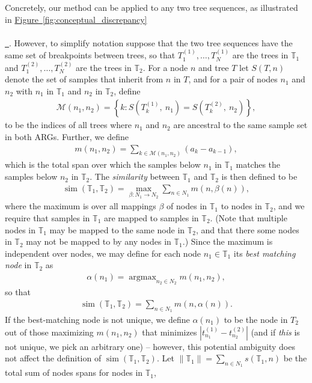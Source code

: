 \documentclass[10pt,twoside,lineno]{gsajnl}
\newcommand{\T}{\mathbb{T}}
\newcommand{\argmax}{\operatorname{argmax}}
\newcommand{\similarity}{\operatorname{sim}}
\newcommand*{\figref}[2][]{%
	\hyperref[{#2}]{%
		Figure~\ref*{#2}%
		\ifx\\#1\\%
		\else
		\,#1%
		\fi
	}%
}
\begin{document}
Concretely, our method can be applied to any two tree sequences,
as illustrated in \figref{fig:conceptual_discrepancy}.
However, to simplify notation suppose that the two tree sequences have the same set of breakpoints
between trees,
so that $T_1^{(1)}, \ldots, T_N^{(1)}$ are the trees in $\T_1$
and $T_1^{(2)}, \ldots, T_N^{(2)}$ are the trees in $\T_2$.
For a node $n$ and tree $T$
let $S(T, n)$ denote the set of samples that inherit from $n$ in $T$,
and for a pair of nodes $n_1$ and $n_2$ with $n_1$ in $\T_1$ and $n_2$ in $\T_2$,
define
\begin{align*}
	\mathcal{M}(n_1, n_2) = \left\{ k : S\left(T^{(1)}_k,\ n_1\right) = S\left(T^{(2)}_k,\ n_2\right) \right\},
\end{align*}
to be the indices of all trees where $n_1$ and $n_2$ are ancestral to the same sample set in both ARGs.
Further, we define
\begin{align*}
    m(n_1, n_2)
    =
    \sum_{k\in \mathcal{M}(n_1, n_2)} (a_k - a_{k-1}) ,  
\end{align*}
which is the total span over which the samples below $n_1$ in $\T_1$
matches the samples below $n_2$ in $\T_2$.
The \emph{similarity} between $\T_1$ and $\T_2$ is then defined to be
\begin{align*}
    \similarity(\T_1, \T_2)
    =
    \max_{\beta:N_1 \to N_2} \sum_{n \in N_1} m(n, \beta(n)) ,
\end{align*}
where the maximum is over all mappings $\beta$ of nodes in $\T_1$ to nodes in $\T_2$, and we require that samples in $\T_1$ are mapped to samples in $\T_2$.
(Note that multiple nodes in $\T_1$ may be mapped to the same node in $\T_2$,
and that there some nodes in $\T_2$ may not be mapped to by any nodes in $\T_1$.)
Since the maximum is independent over nodes, we may define for each node $n_1 \in \T_1$
its \emph{best matching node} in $\T_2$ as
\begin{align*}
    \alpha(n_1) = \argmax_{n_2 \in N_2} m(n_1, n_2) ,
\end{align*}
so that
\begin{align*}
    \similarity(\T_1, \T_2)
    =
    \sum_{n \in N_1} m(n, \alpha(n)) .
\end{align*}
If the best-matching node is not unique, we define $\alpha(n_1)$ to be the node in $T_2$
out of those maximizing $m(n_1, n_2)$ that minimizes $|t^{(1)}_{n_1} - t^{(2)}_{n_2}|$
(and if \emph{this} is not unique, we pick an arbitrary one) --
however, this potential ambiguity does not affect the definition of $\similarity(\T_1, \T_2)$.
Let $\|\T_1\|=\sum_{n\in N_1}s(\T_1,n)$ be the total sum of nodes spans for nodes in $\T_1$,
\end{document}
